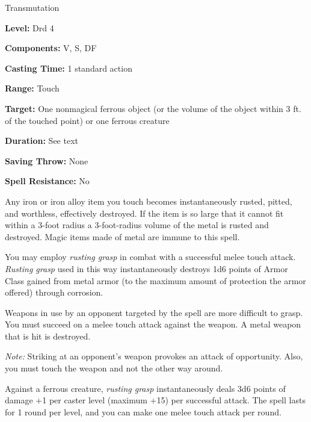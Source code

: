 
Transmutation

\textbf{Level:} Drd 4

\textbf{Components:} V, S, DF

\textbf{Casting Time:} 1 standard action

\textbf{Range:} Touch

\textbf{Target:} One nonmagical ferrous object (or the volume of the object within 
3 ft. of the touched point) or one ferrous creature

\textbf{Duration:} See text

\textbf{Saving Throw:} None

\textbf{Spell Resistance:} No

Any iron or iron alloy item you touch becomes instantaneously rusted, pitted, and 
worthless, effectively destroyed. If the item is so large that it cannot fit within 
a 3-foot radius a 3-foot-radius volume of the metal is rusted and destroyed. Magic 
items made of metal are immune to this spell.

You may employ \textit{rusting grasp} in combat with a successful melee touch attack. 
\textit{Rusting grasp} used in this way instantaneously destroys 1d6 points of 
Armor Class gained from metal armor (to the maximum amount of protection the armor 
offered) through corrosion. 

Weapons in use by an opponent targeted by the spell are more difficult to grasp. 
You must succeed on a melee touch attack against the weapon. A metal weapon that 
is hit is destroyed.

\textit{Note:} Striking at an opponent's weapon provokes an attack of opportunity. 
Also, you must touch the weapon and not the other way around.

Against a ferrous creature, \textit{rusting grasp} instantaneously deals 3d6 points 
of damage +1 per caster level (maximum +15) per successful attack. The spell lasts 
for 1 round per level, and you can make one melee touch attack per round.




